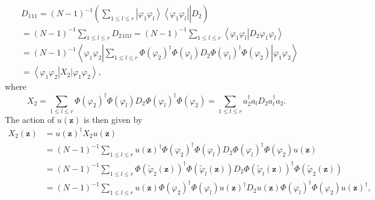 \documentclass[aps,preprint]{revtex4}%
\begin{document}
\begin{align}
&  D_{1}{}_{11}=\left(  N-1\right)  ^{-1}\left(  \left.  \sum_{1\leq l\leq
r}\overset{}{\left\vert \varphi_{1}\varphi_{l}\right\rangle \left\langle
\varphi_{1}\varphi_{l}\right\vert }\right\vert D_{2}\right)  \nonumber\\
&  =\left(  N-1\right)  ^{-1}\sum_{1\leq l\leq r}D_{2}{}_{1l1l}=\left(
N-1\right)  ^{-1}\sum_{1\leq l\leq r}\left\langle \varphi_{1}\varphi
_{l}\left\vert D_{2}\varphi_{1}\varphi_{l}\right.  \right\rangle \nonumber\\
&  =\left(  N-1\right)  ^{-1}\left\langle \varphi_{1}\varphi_{2}\left\vert
\sum_{1\leq l\leq r}\Phi\left(  \varphi_{2}\right)  ^{\dagger}\Phi\left(
\varphi_{l}\right)  D_{2}\left.  \Phi\left(  \varphi_{l}\right)  ^{\dagger
}\Phi\left(  \varphi_{2}\right)  \right\vert \right.  \varphi_{1}\varphi
_{2}\right\rangle \nonumber\\
&  =\left\langle \varphi_{1}\varphi_{2}\left\vert \left.  X_{2}\right\vert
\varphi_{1}\varphi_{2}\right.  \right\rangle ,
\end{align}
where
\begin{equation}
X_{2}=\sum_{1\leq l\leq r}\Phi\left(  \varphi_{2}\right)  ^{\dagger}%
\Phi\left(  \varphi_{l}\right)  D_{2}\Phi\left(  \varphi_{l}\right)
^{\dagger}\Phi\left(  \varphi_{2}\right)  =\sum_{1\leq l\leq r}a_{2}^{\dagger
}a_{l}D_{2}a_{l}^{\dagger}a_{2}.
\end{equation}
The action of $u\left(  \mathbf{z}\right)  $ is then given by
\begin{align}
X_{2}\left(  \mathbf{z}\right)   &  =u\left(  \mathbf{z}\right)  ^{\dagger
}X_{2}u\left(  \mathbf{z}\right)  \nonumber\\
&  =\left(  N-1\right)  ^{-1}\sum_{1\leq l\leq r}u\left(  \mathbf{z}\right)
^{\dagger}\Phi\left(  \varphi_{2}\right)  ^{\dagger}\Phi\left(  \varphi
_{l}\right)  D_{2}\Phi\left(  \varphi_{l}\right)  ^{\dagger}\Phi\left(
\varphi_{2}\right)  u\left(  \mathbf{z}\right)  \nonumber\\
&  =\left(  N-1\right)  ^{-1}\sum_{1\leq l\leq r}\Phi\left(  \tilde{\varphi
}_{2}\left(  \mathbf{z}\right)  \right)  ^{\dagger}\Phi\left(  \tilde{\varphi
}_{l}\left(  \mathbf{z}\right)  \right)  D_{2}\Phi\left(  \tilde{\varphi}%
_{l}\left(  \mathbf{z}\right)  \right)  ^{\dagger}\Phi\left(  \tilde{\varphi
}_{2}\left(  \mathbf{z}\right)  \right)  \nonumber\\
&  =\left(  N-1\right)  ^{-1}\sum_{1\leq l\leq r}u\left(  \mathbf{z}\right)
\Phi\left(  \varphi_{2}\right)  ^{\dagger}\Phi\left(  \varphi_{l}\right)
u\left(  \mathbf{z}\right)  ^{\dagger}D_{2}u\left(  \mathbf{z}\right)
\Phi\left(  \varphi_{l}\right)  ^{\dagger}\Phi\left(  \varphi_{2}\right)
u\left(  \mathbf{z}\right)  ^{\dagger},
\end{align}%
\end{document}
